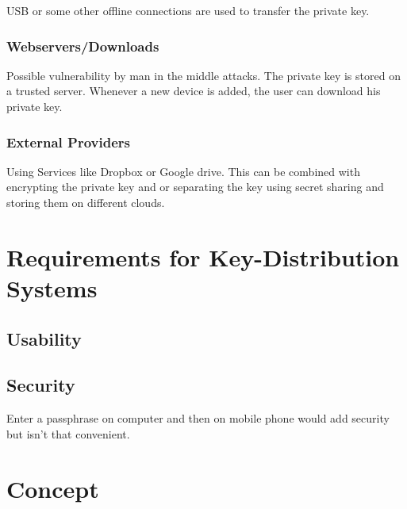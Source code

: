 \documentclass[12pt,oneside,a4paper,parskip]{scrbook}
\begin{document}
USB or some other offline connections are used to transfer the private key.



\subsection{Webservers/Downloads}

Possible vulnerability by man in the middle attacks.
The private key is stored on a trusted server. Whenever a new device is added, the user can download his private key.

\subsection{External Providers}

Using Services like Dropbox or Google drive. This can be combined with encrypting the private key and or separating the key using secret sharing and 
storing them on different clouds. 




\chapter{Requirements for Key-Distribution Systems}

\section{Usability}

\section{Security}

Enter a passphrase on computer and then on mobile phone would add security but isn't that convenient.

\chapter{Concept}
\end{document}
